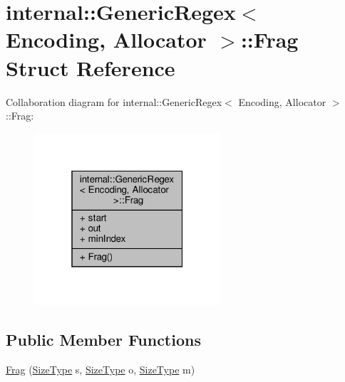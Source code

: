 \hypertarget{structinternal_1_1GenericRegex_1_1Frag}{}\section{internal\+:\+:Generic\+Regex$<$ Encoding, Allocator $>$\+:\+:Frag Struct Reference}
\label{structinternal_1_1GenericRegex_1_1Frag}


Collaboration diagram for internal\+:\+:Generic\+Regex$<$ Encoding, Allocator $>$\+:\+:Frag\+:
\nopagebreak
\begin{figure}[H]
\begin{center}
\leavevmode
\includegraphics[width=196pt]{structinternal_1_1GenericRegex_1_1Frag__coll__graph}
\end{center}
\end{figure}
\subsection*{Public Member Functions}
\begin{DoxyCompactItemize}
\item 
\hyperlink{structinternal_1_1GenericRegex_1_1Frag_a377c8d806013ce14ff941be9427e80ff}{Frag} (\hyperlink{rapidjson_8h_a5ed6e6e67250fadbd041127e6386dcb5}{Size\+Type} s, \hyperlink{rapidjson_8h_a5ed6e6e67250fadbd041127e6386dcb5}{Size\+Type} o, \hyperlink{rapidjson_8h_a5ed6e6e67250fadbd041127e6386dcb5}{Size\+Type} m)
\end{DoxyCompactItemize}
